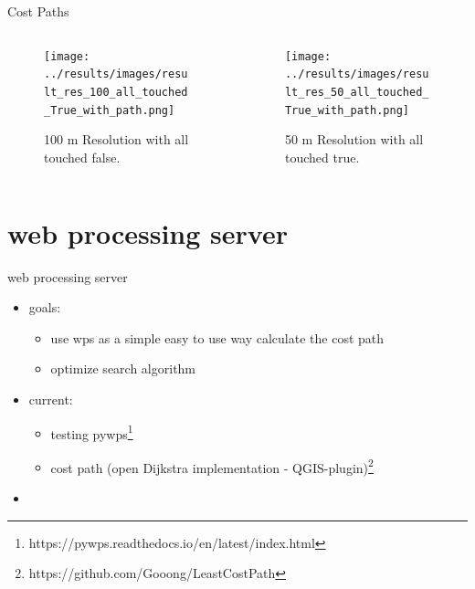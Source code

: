 \documentclass[usenames,dvipsnames,aspectratio=169]{beamer}
\begin{document}
\begin{frame}{Cost Paths}
	\begin{columns}[T] %
		\begin{column}{.48\textwidth}
			\begin{figure}[htb]
				\texttt{[image: ../results/images/result\_res\_100\_all\_touched\_True\_with\_path.png]}
				\caption{100 m Resolution with all touched false.}
			\end{figure}
		\end{column}
		\begin{column}{.48\textwidth}
			\begin{figure}[htb]
				\texttt{[image: ../results/images/result\_res\_50\_all\_touched\_True\_with\_path.png]}
				\caption{50 m Resolution with all touched true.}
			\end{figure}
		\end{column}
	\end{columns}
\end{frame}

\section{web processing server}
\begin{frame}{web processing server}
	\begin{itemize}
		\item goals: 
		\begin{itemize}
			\item use wps as a simple easy to use way calculate the cost path
			\item optimize search algorithm
		\end{itemize}
		\item current: 
		\begin{itemize}
			\item testing pywps\footnote{https://pywps.readthedocs.io/en/latest/index.html}
			\item cost path (open Dijkstra implementation - QGIS-plugin)\footnote{https://github.com/Gooong/LeastCostPath}
		\end{itemize}
		\item	
	\end{itemize}
\end{frame}
\end{document}
